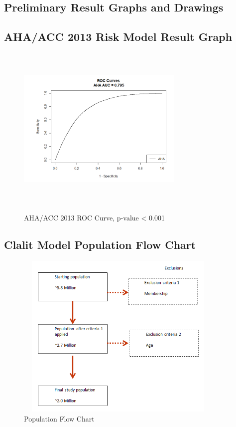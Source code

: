 \documentclass[a4paper,12pt]{article}
\begin{document}
\begin{appendices}
   		\section{Preliminary Result Graphs and Drawings}
   			\subsection{AHA/ACC 2013 Risk Model  Result Graph}
	   		\begin{figure}[H]
   				\includegraphics[width=8cm, height=8cm]{prelim-results/AHA/AHA_ROC.png}
   				\label{AHAROC}
   				\captionsetup{justification=justified,singlelinecheck=false,margin=1cm}
   				\caption{AHA/ACC 2013 ROC Curve, p-value < 0.001}
	   		\end{figure}
   		
   			\subsection{Clalit Model Population Flow Chart}
   			\begin{figure}[H]
	   			\includegraphics[width=10cm,height=8cm]{prelim-results/Panpredictor/pop_flow_chart.png}
	   			\captionsetup{justification=justified,singlelinecheck=false,margin=2cm}
	   			\caption{Population Flow Chart}
	   		\end{figure}
   		
   	\end{appendices}
	
\end{document}
